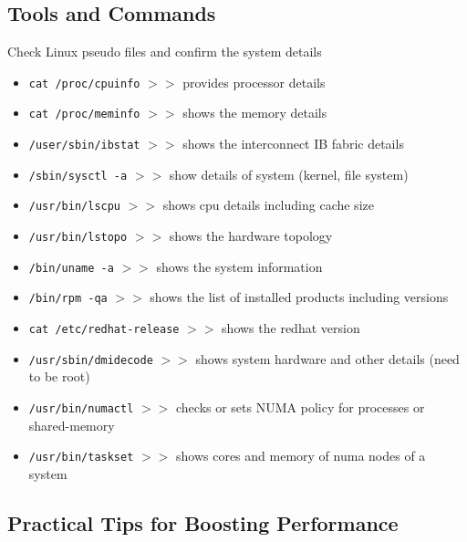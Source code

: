 \documentclass[11pt]{book} %
\begin{document}
\subsection{Tools and Commands}
Check Linux pseudo files and confirm the system details
\begin{itemize}
\item \verb|cat /proc/cpuinfo| $>>$ provides processor details
\item \verb|cat /proc/meminfo| $>>$ shows the memory details
\item \verb|/user/sbin/ibstat| $>>$ shows the interconnect IB fabric details
\item \verb|/sbin/sysctl -a|    $>>$ show details of system (kernel, file system)
\item \verb|/usr/bin/lscpu| $>>$ shows cpu details including cache size
\item \verb|/usr/bin/lstopo| $>>$ shows the hardware topology
\item \verb|/bin/uname -a| $>>$ shows the system information
\item \verb|/bin/rpm -qa| $>>$ shows the list of installed products including versions
\item \verb|cat /etc/redhat-release| $>>$ shows the redhat version
\item \verb|/usr/sbin/dmidecode| $>>$ shows system hardware and other details (need to be root)
\item \verb|/usr/bin/numactl| $>>$ checks or sets NUMA policy for processes or shared-memory
\item \verb|/usr/bin/taskset| $>>$ shows cores and memory of numa nodes of a system
\end{itemize}


\subsection{Practical Tips for Boosting Performance}
\end{document}
